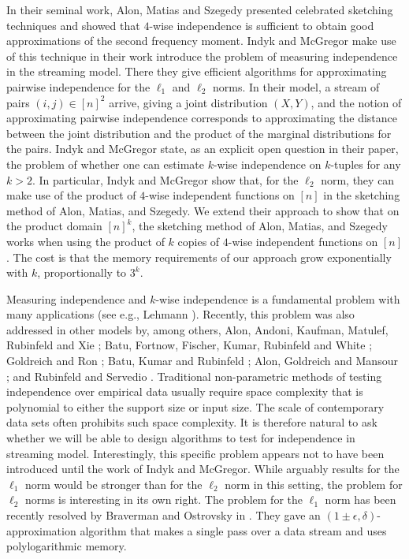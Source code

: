 \def\draft{0}  \documentclass[proceedings]{stacs}
\theoremstyle{plain}\newtheorem{satz}[thm]{Satz}
\theoremstyle{definition}\newtheorem{crucial}[thm]{Crucial Definition}
\begin{document}
In their seminal work, Alon, Matias and Szegedy \cite{ams} presented
celebrated sketching techniques and showed that $4$-wise independence
is sufficient to obtain good approximations of the second frequency
moment.  Indyk and McGregor \cite{IM08} make use of this technique in
their work introduce the problem of measuring independence in the
streaming model.  There they give efficient algorithms for
approximating pairwise independence for the $\ell_1$ and $\ell_2$ norms.
In their model, a stream of pairs $(i,j) \in [n]^2$ arrive, giving a
joint distribution $(X,Y)$, and the notion of approximating pairwise
independence corresponds to approximating the distance between the
joint distribution and the product of the marginal distributions for
the pairs.  Indyk and McGregor state, as an explicit open question in
their paper, the problem of whether one can estimate $k$-wise
independence on $k$-tuples for any $k> 2$.  In particular, Indyk and McGregor show that, for the $\ell_2$ norm, they
can make use of the product of $4$-wise independent functions on $[n]$
in the sketching method of Alon, Matias, and Szegedy.  We extend their
approach to show that on the product domain $[n]^k$, the sketching
method of Alon, Matias, and Szegedy works when using the product of
$k$ copies of $4$-wise independent functions on $[n]$.  The cost is that the
memory requirements of our approach grow exponentially with $k$,
proportionally to $3^k$.



Measuring
independence and $k$-wise independence is a fundamental problem with
many applications (see e.g., Lehmann \cite{stat}). Recently, this problem was also addressed in other models by, among
others, Alon, Andoni, Kaufman, Matulef, Rubinfeld and Xie
\cite{k-wise_independenc}; Batu, Fortnow, Fischer, Kumar, Rubinfeld
and White \cite{batu_independence}; Goldreich and Ron \cite{ind1};
Batu, Kumar and Rubinfeld \cite{ind2}; Alon, Goldreich and Mansour
\cite{ind3}; and Rubinfeld and Servedio \cite{ind4}.
Traditional non-parametric methods of testing independence over empirical data
usually require space complexity that is polynomial to either the support
size or input size. The scale of contemporary data sets often
prohibits such space complexity.  It is therefore natural to ask
whether we will be able to design algorithms to test for independence
in streaming model. Interestingly, this specific problem appears not
to have been introduced until the work of Indyk and McGregor.  While
arguably results for the $\ell_1$ norm would be stronger than for
the $\ell_2$ norm in this setting, the problem for $\ell_2$ norms
is interesting in its own right. The problem for the $\ell_1$ norm has been
recently resolved by Braverman and Ostrovsky in \cite{BO03}. They gave an $(1\pm \epsilon, \delta)$-approximation algorithm
that makes a single pass over a data stream and uses polylogarithmic memory.
\end{document}
